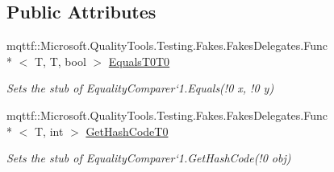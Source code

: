 \subsection*{Public Attributes}
\begin{DoxyCompactItemize}
\item 
mqttf\-::\-Microsoft.\-Quality\-Tools.\-Testing.\-Fakes.\-Fakes\-Delegates.\-Func\\*
$<$ T, T, bool $>$ \hyperlink{class_system_1_1_collections_1_1_generic_1_1_fakes_1_1_stub_equality_comparer_3_01_t_01_4_a7fadef603eafc0627fc62f31da79ce33}{Equals\-T0\-T0}
\begin{DoxyCompactList}\small\item\em Sets the stub of Equality\-Comparer`1.Equals(!0 x, !0 y)\end{DoxyCompactList}\item 
mqttf\-::\-Microsoft.\-Quality\-Tools.\-Testing.\-Fakes.\-Fakes\-Delegates.\-Func\\*
$<$ T, int $>$ \hyperlink{class_system_1_1_collections_1_1_generic_1_1_fakes_1_1_stub_equality_comparer_3_01_t_01_4_aa03072c7dc21f4a8e3de587752be3bc4}{Get\-Hash\-Code\-T0}
\begin{DoxyCompactList}\small\item\em Sets the stub of Equality\-Comparer`1.Get\-Hash\-Code(!0 obj)\end{DoxyCompactList}\end{DoxyCompactItemize}
